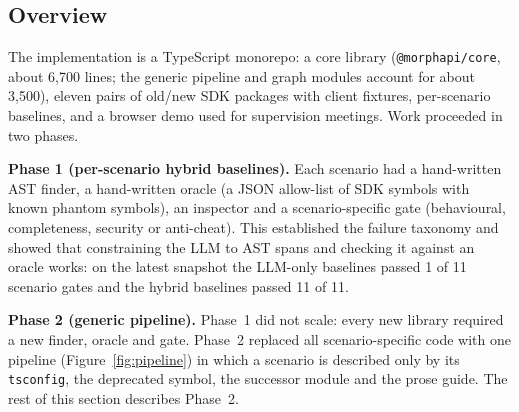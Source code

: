 \documentclass[11pt,a4paper]{article}
\newcommand{\code}[1]{\texttt{#1}}
\begin{document}
\subsection{Overview}

The implementation is a TypeScript monorepo: a core library (\code{@morphapi/core},
about 6{,}700 lines; the generic pipeline and graph modules account for about 3{,}500),
eleven pairs of old/new SDK packages with client fixtures, per-scenario baselines, and a
browser demo used for supervision meetings. Work proceeded in two phases.

\textbf{Phase 1 (per-scenario hybrid baselines).} Each scenario had a hand-written AST
finder, a hand-written oracle (a JSON allow-list of SDK symbols with known phantom
symbols), an inspector and a scenario-specific gate (behavioural, completeness, security or
anti-cheat). This established the failure taxonomy and showed that constraining the LLM to
AST spans and checking it against an oracle works: on the latest snapshot the LLM-only
baselines passed 1 of 11 scenario gates and the hybrid baselines passed 11 of 11.

\textbf{Phase 2 (generic pipeline).} Phase~1 did not scale: every new library required a
new finder, oracle and gate. Phase~2 replaced all scenario-specific code with one pipeline
(Figure~\ref{fig:pipeline}) in which a scenario is described only by its \code{tsconfig},
the deprecated symbol, the successor module and the prose guide. The rest of this section
describes Phase~2.
\end{document}
